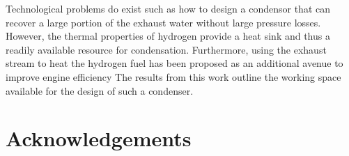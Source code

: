 \documentclass[conf]{new-aiaa}
\begin{document}
Technological problems do exist such as how to design a condensor that can recover a large portion of the exhaust water without large pressure losses.
However, the thermal properties of hydrogen provide a heat sink and thus a readily available resource for condensation.
Furthermore, using the exhaust stream to heat the hydrogen fuel has been proposed as an additional avenue to improve engine efficiency%
The results from this work outline the working space available for the design of such a condenser.

\section{Acknowledgements}


\end{document}
